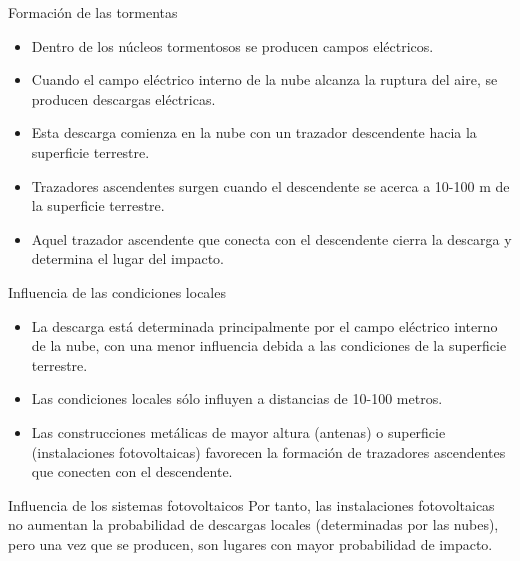 \documentclass[aspectratio=169, usenames,svgnames,dvipsnames]{beamer}
\begin{document}
\begin{frame}[label={sec:orge0c3c3f}]{Formación de las tormentas}
\begin{itemize}
\item Dentro de los núcleos tormentosos se producen campos eléctricos.

\item Cuando el campo eléctrico interno de la nube alcanza la ruptura del
aire, se producen descargas eléctricas.

\item \alert{Esta descarga comienza en la nube} con un \alert{trazador descendente} hacia
la superficie terrestre.

\item Trazadores ascendentes surgen cuando el descendente se acerca a
10-100 m de la superficie terrestre.

\item Aquel trazador ascendente que conecta con el descendente cierra la
descarga y determina el lugar del impacto.
\end{itemize}
\end{frame}

\begin{frame}[label={sec:orgdc7072e}]{Influencia de las condiciones locales}
\begin{itemize}
\item \alert{La descarga está determinada principalmente por el campo eléctrico
interno de la nube}, con una menor influencia debida a las
condiciones de la superficie terrestre.

\item Las \alert{condiciones locales sólo influyen} a distancias de 10-100 metros.

\item Las \alert{construcciones metálicas de mayor altura} (antenas) o superficie
(instalaciones fotovoltaicas) favorecen la formación de trazadores
ascendentes que conecten con el descendente.
\end{itemize}
\end{frame}

\begin{frame}[label={sec:orgc48fda1}]{Influencia de los sistemas fotovoltaicos}
Por tanto, \alert{las instalaciones fotovoltaicas no aumentan la probabilidad
de descargas locales} (determinadas por las nubes), pero una vez que se
producen, son lugares con mayor probabilidad de impacto.
\end{frame}
\end{document}
